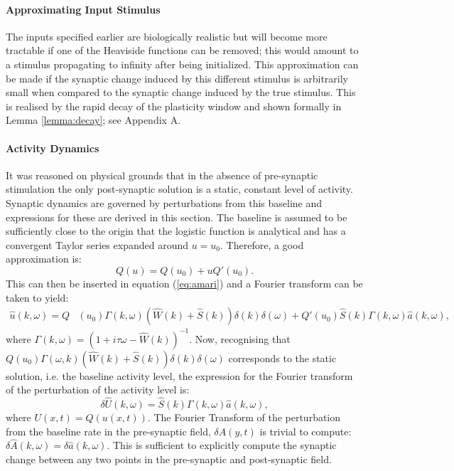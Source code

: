 \paragraph{Approximating Input Stimulus}
The inputs specified earlier are biologically realistic but will become more tractable if one of the Heaviside functions can be removed; this would amount to a stimulus propagating to infinity after being initialized. This approximation can be made if the synaptic change induced by this different stimulus is arbitrarily small when compared to the synaptic change induced by the true stimulus. This is realised by the rapid decay of the plasticity window and shown formally in Lemma \ref{lemma:decay}; see Appendix A.

\paragraph{Activity Dynamics}
It was reasoned on physical grounds that in the absence of pre-synaptic stimulation the only post-synaptic solution is a static, constant level of activity. Synaptic dynamics are governed by perturbations from this baseline and expressions for these are derived in this section. The baseline is assumed to be sufficiently close to the origin that the logistic function is analytical and has a convergent Taylor series expanded around $u = u_0$. Therefore, a good approximation is:
\begin{equation}
	Q(u) = Q(u_0) + u Q'(u_0). \label{eq:firingapproximation}
\end{equation}
This can then be inserted in equation (\ref{eq:amari}) and a Fourier transform can be taken to yield:
\begin{align}
	\hat{u}(k,\omega) = Q&(u_0)\Gamma(k,\omega)(\hat{W}(k)+\hat{S}(k))\delta(k)\delta(\omega) + Q'(u_0)\hat{S}(k)\Gamma(k,\omega)\hat{a}(k,\omega),
\end{align}
where $\Gamma(k,\omega)=(1 + i\tau\omega - \hat{W}(k))^{-1}$. Now, recognising that $Q(u_0)\Gamma(\omega,k)(\hat{W}(k)+\hat{S}(k))\delta(k)\delta(\omega)$ corresponds to the static solution, i.e. the baseline activity level, the expression for the Fourier transform of the perturbation of the activity level is: 
\begin{equation}
	\delta\hat{U}(k,\omega) =\hat{S}(k)\Gamma(k,\omega)\hat{a}(k,\omega),
\end{equation}
where $U(x,t)=Q(u(x,t))$. The Fourier Transform of the perturbation from the baseline rate in the pre-synaptic field, $\delta A(y,t)$ is trivial to compute: $ \delta \hat{A}(k,\omega)=\delta \hat{a} (k,\omega)$. This is sufficient to explicitly compute the synaptic change between any two points in the pre-synaptic and post-synaptic field. 
